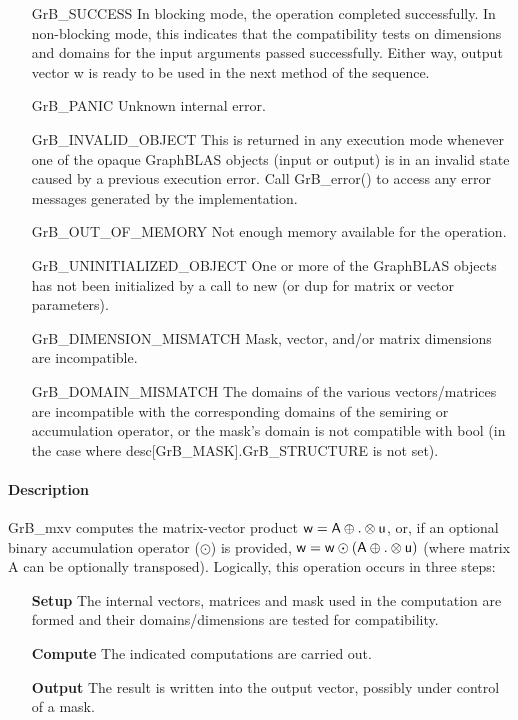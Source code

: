 \begin{itemize}[leftmargin=2.1in]
    \item[{\sf GrB\_SUCCESS}]         In blocking mode, the operation completed
    successfully. In non-blocking mode, this indicates that the compatibility 
    tests on dimensions and domains for the input arguments passed successfully. 
    Either way, output vector {\sf w} is ready to be used in the next method of 
    the sequence.

    \item[{\sf GrB\_PANIC}]           Unknown internal error.

    \item[{\sf GrB\_INVALID\_OBJECT}] This is returned in any execution mode 
    whenever one of the opaque GraphBLAS objects (input or output) is in an invalid 
    state caused by a previous execution error.  Call {\sf GrB\_error()} to access 
    any error messages generated by the implementation.

    \item[{\sf GrB\_OUT\_OF\_MEMORY}] Not enough memory available for the operation.

    \item[{\sf GrB\_UNINITIALIZED\_OBJECT}] One or more of the GraphBLAS objects 
    has not been initialized by a call to {\sf new} (or {\sf dup} for matrix or
    vector parameters).

    \item[{\sf GrB\_DIMENSION\_MISMATCH}] Mask, vector, and/or matrix 
    dimensions are incompatible.

    \item[{\sf GrB\_DOMAIN\_MISMATCH}]    The domains of the various vectors/matrices are
    incompatible with the corresponding domains of the semiring or
    accumulation operator, or the mask's domain is not compatible with {\sf bool}
    (in the case where {\sf desc[GrB\_MASK].GrB\_STRUCTURE} is not set).
\end{itemize}

\paragraph{Description}

{\sf GrB\_mxv} computes the matrix-vector product ${\sf w} = {\sf A}
\oplus . \otimes {\sf u}$, or, if an optional binary accumulation
operator ($\odot$) is provided, ${\sf w} = {\sf w} \odot \left({\sf A}
\oplus . \otimes {\sf u}\right)$ (where matrix {\sf A}
 can be optionally transposed).  Logically, this operation
occurs in three steps:
\begin{enumerate}[leftmargin=0.85in]
\item[\bf Setup] The internal vectors, matrices and mask used in the computation are formed and their domains/dimensions are tested for compatibility.
\item[\bf Compute] The indicated computations are carried out.
\item[\bf Output] The result is written into the output vector, possibly under control of a mask.
\end{enumerate}


